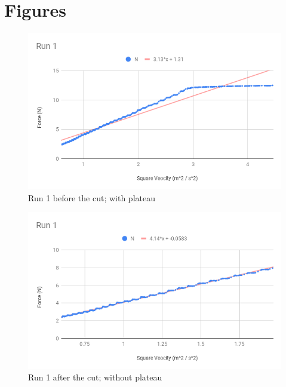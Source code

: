 \section{Figures}
\begin{figure}[ht]
    \centering
    \includegraphics[scale=0.71]{image/10-centripetal/Run1BeforeCut.png}
    \caption{Run 1 before the cut; with plateau}
    \label{figure.10.run.1.before}
\end{figure}
\begin{figure}[ht]
    \centering
    \includegraphics[scale=0.71]{image/10-centripetal/Run1.png}
    \caption{Run 1 after the cut; without plateau}
    \label{figure.10.run.1}
\end{figure}
